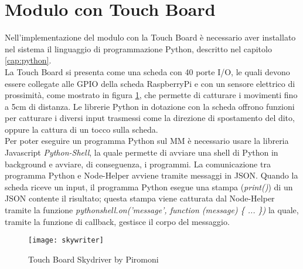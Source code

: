 \section{Modulo con Touch Board}\label{cap:touch}
Nell'implementazione del modulo con la Touch Board \`e necessario aver installato nel sistema
il linguaggio di programmazione Python, descritto nel capitolo \ref{cap:python}.\\
La Touch Board si presenta come una scheda con 40 porte I/O, le quali devono essere collegate alle
GPIO della scheda RaspberryPi e con un sensore elettrico di prossimit\`a, come mostrato in figura \ref{fig:TouchBoard}, che permette di catturare i movimenti fino a 5cm di distanza.
Le librerie Python in dotazione con la scheda offrono funzioni per catturare i diversi input trasmessi come
la direzione di spostamento del dito, oppure la cattura di un tocco sulla scheda.\\
Per poter eseguire un programma Python sul MM \`e necessario usare la libreria Javascript \emph{Python-Shell}, la quale
permette di avviare una shell di Python in background e avviare, di conseguenza, i programmi.
La comunicazione tra programma Python e Node-Helper avviene tramite messaggi in JSON. Quando la scheda riceve un input,
il programma Python esegue una stampa (\emph{print()}) di un JSON contente il risultato; questa stampa viene catturata dal
Node-Helper tramite la funzione \emph{pythonshell.on('message', function (message) \{ ... \})} la quale, tramite la funzione di callback,
gestisce il corpo del messaggio.

\begin{figure}[H]
    \texttt{[image: skywriter]}
    \caption{Touch Board Skydriver by Piromoni}
    \label{fig:TouchBoard}
\end{figure}

